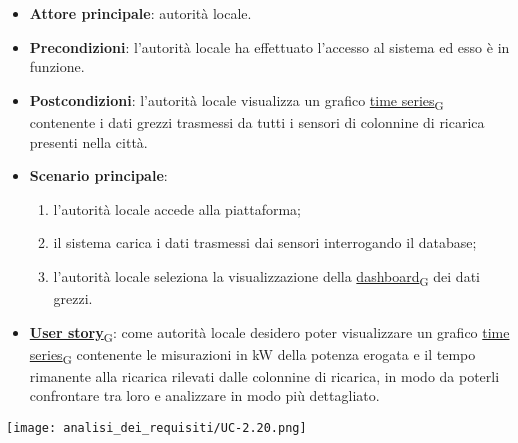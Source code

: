\begin{itemize}
	\item \textbf{Attore principale}: autorità locale.
	\item \textbf{Precondizioni}: l'autorità locale ha effettuato l'accesso al sistema ed esso è in funzione.
	\item \textbf{Postcondizioni}: l'autorità locale visualizza un grafico \href{https://7last.github.io/docs/pb/documentazione-interna/glossario\#time-series}{time series\textsubscript{G}} contenente i dati grezzi trasmessi da tutti i sensori
	      di colonnine di ricarica presenti nella città.
	\item \textbf{Scenario principale}:
	      \begin{enumerate}
		      \item l'autorità locale accede alla piattaforma;
		      \item il sistema carica i dati trasmessi dai sensori interrogando il database;
		      \item l'autorità locale seleziona la visualizzazione della \href{https://7last.github.io/docs/pb/documentazione-interna/glossario\#dashboard}{dashboard\textsubscript{G}} dei dati grezzi.
	      \end{enumerate}
	\item \href{https://7last.github.io/docs/pb/documentazione-interna/glossario\#user-story}{\textbf{User story}\textsubscript{G}}:
	      come autorità locale desidero poter visualizzare un grafico \href{https://7last.github.io/docs/pb/documentazione-interna/glossario\#time-series}{time series\textsubscript{G}} contenente le misurazioni in kW della potenza erogata
	      e il tempo rimanente alla ricarica rilevati dalle colonnine di ricarica, in modo da poterli confrontare tra loro e analizzare in modo più dettagliato.
\end{itemize}
\begin{center}
	\texttt{[image: analisi\_dei\_requisiti/UC-2.20.png]}
\end{center}

